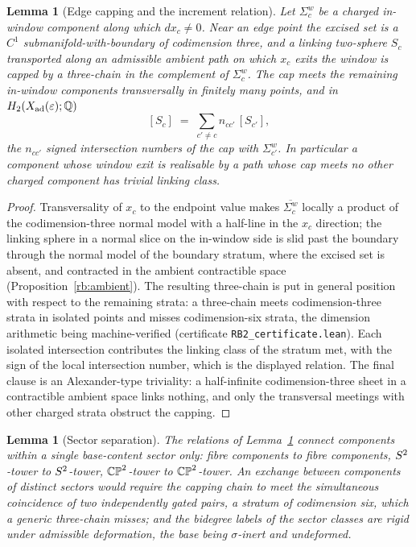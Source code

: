 \documentclass[11pt]{article}
\numberwithin{equation}{section}
\theoremstyle{plain}
\newtheorem{lemma}[theorem]{Lemma}
\theoremstyle{definition}
\theoremstyle{remark}
\newcommand{\Xad}{X_{\mathrm{ad}}}
\begin{document}
\begin{lemma}[Edge capping and the increment
relation]\label{rb2:edge}
Let $\Sigma_{c}^{w}$ be a charged in-window component along which
$dx_{c} \neq 0$. Near an edge point the excised set is a $C^{1}$
submanifold-with-boundary of codimension three, and a linking
two-sphere $S_{c}$ transported along an admissible ambient path on
which $x_{c}$ exits the window is capped by a three-chain in the
complement of $\Sigma_{c}^{w}$. The cap meets the remaining
in-window components transversally in finitely many points, and in
$H_{2}(\Xad(\varepsilon); \Q)$
\begin{equation}\label{eq:increment}
[S_{c}] \;=\; \sum_{c' \neq c} n_{cc'}\,[S_{c'}],
\end{equation}
the $n_{cc'}$ signed intersection numbers of the cap with
$\Sigma_{c'}^{w}$. In particular a component whose window exit is
realisable by a path whose cap meets no other charged component has
trivial linking class.
\end{lemma}

\begin{proof}
Transversality of $x_{c}$ to the endpoint value makes
$\overline{\Sigma_{c}^{w}}$ locally a product of the
codimension-three normal model with a half-line in the $x_{c}$
direction; the linking sphere in a normal slice on the in-window
side is slid past the boundary through the normal model of the
boundary stratum, where the excised set is absent, and contracted
in the ambient contractible space
(Proposition~\ref{rb:ambient}). The resulting three-chain is put in
general position with respect to the remaining strata: a
three-chain meets codimension-three strata in isolated points and
misses codimension-six strata, the dimension arithmetic being
machine-verified (certificate \texttt{RB2\_certificate.lean}). Each
isolated intersection contributes the linking class of the stratum
met, with the sign of the local intersection number, which is the
displayed relation. The final clause is an Alexander-type
triviality: a half-infinite codimension-three sheet in a
contractible ambient space links nothing, and only the transversal
meetings with other charged strata obstruct the capping.
\end{proof}

\begin{lemma}[Sector separation]\label{rb2:sector}
The relations of Lemma~\textup{\ref{rb2:edge}} connect components
within a single base-content sector only: fibre components to fibre
components, $S^2$-tower to $S^2$-tower, $\mathbb{CP}^2$-tower to
$\mathbb{CP}^2$-tower. An exchange between components of distinct sectors
would require the capping chain to meet the simultaneous
coincidence of two independently gated pairs, a stratum of
codimension six, which a generic three-chain misses; and the
bidegree labels of the sector classes are rigid under admissible
deformation, the base being $\sigma$-inert and undeformed.
\end{lemma}
\end{document}
